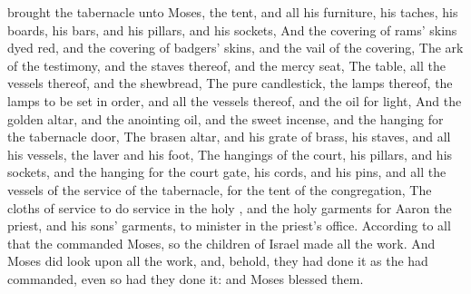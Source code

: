 {brought the
tabernacle unto
Moses, the
tent, and all his
furniture, his
taches, his
boards, his
bars, and his
pillars, and his
sockets,
And the
covering of
rams’
skins dyed
red, and the
covering of
badgers’
skins, and the
vail of the
covering,
The
ark of the
testimony, and the
staves thereof, and the mercy
seat,
The
table,
{} all the
vessels thereof, and the
shewbread,
The
pure
candlestick,
{} the
lamps thereof,
{} the
lamps to be set in
order, and all the
vessels thereof, and the
oil for
light,
And the
golden
altar, and the
anointing
oil, and the
sweet
incense, and the
hanging for the
tabernacle
door,
The
brasen
altar, and his
grate of
brass, his
staves, and all his
vessels, the
laver and his
foot,
The
hangings of the
court, his
pillars, and his
sockets, and the
hanging for the
court
gate, his
cords, and his
pins, and all the
vessels of the
service of the
tabernacle, for the
tent of the
congregation,
The
cloths of
service to do
service in the
holy
{}, and the
holy
garments for
Aaron the
priest, and his
sons’
garments, to minister in the
priest’s office.
According to all that the
{}
commanded
Moses, so the
children of
Israel
made all the
work.
And
Moses did
look upon
all the
work, and, behold, they had
done it as the
{} had
commanded, even so had they
done it: and
Moses
blessed them.

}
